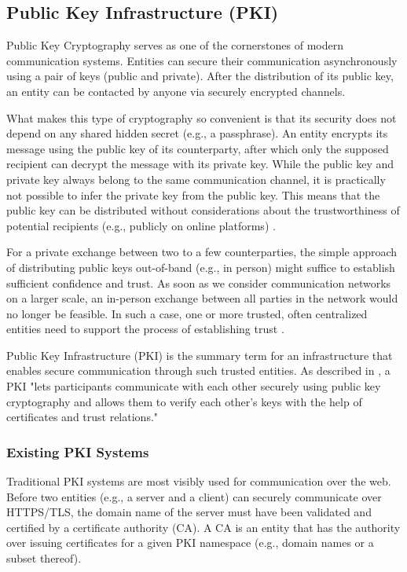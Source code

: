 \subsection{Public Key Infrastructure (PKI)}
\label{subsec:03_pki}

Public Key Cryptography serves as one of the cornerstones of modern communication systems. Entities can secure their communication asynchronously using a pair of keys (public and private). After the distribution of its public key, an entity can be contacted by anyone via securely encrypted channels.

What makes this type of cryptography so convenient is that its security does not depend on any shared hidden secret (e.g., a passphrase). An entity encrypts its message using the public key of its counterparty, after which only the supposed recipient can decrypt the message with its private key. While the public key and private key always belong to the same communication channel, it is practically not possible to infer the private key from the public key. This means that the public key can be distributed without considerations about the trustworthiness of potential recipients (e.g., publicly on online platforms) \cite{straub_tobias_usability_2006}.

For a private exchange between two to a few counterparties, the simple approach of distributing public keys out-of-band (e.g., in person) might suffice to establish sufficient confidence and trust. As soon as we consider communication networks on a larger scale, an in-person exchange between all parties in the network would no longer be feasible. In such a case, one or more trusted, often centralized entities need to support the process of establishing trust \cite{straub_tobias_usability_2006}.

Public Key Infrastructure (PKI) is the summary term for an infrastructure that enables secure communication through such trusted entities. As described in \cite{straub_tobias_usability_2006}, a PKI "lets participants communicate with each other securely using public key cryptography and allows them to verify each other's keys with the help of certificates and trust relations."


\subsubsection{Existing PKI Systems}

Traditional PKI systems are most visibly used for communication over the web. Before two entities (e.g., a server and a client) can securely communicate over HTTPS/TLS, the domain name of the server must have been validated and certified by a certificate authority (CA). A CA is an entity that has the authority over issuing certificates for a given PKI namespace (e.g., domain names or a subset thereof).

